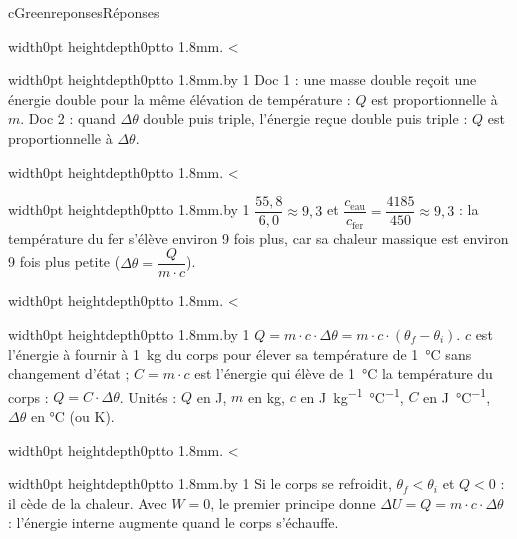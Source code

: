\documentclass[11pt,a4paper]{article}
\newif\ifeleve
\newlength{\interligne}\setlength{\interligne}{7mm}
\newlength{\replen}
\newcommand{\pointilles}{{\color{cInk2!60}\leaders\hbox to 1.8mm{\hss.\hss}\hfill}\kern0pt}
\newcommand{\lignes}[1]{\leavevmode\vrule width0pt height\dimexpr\interligne-1mm\relax depth0pt\pointilles
  \lgn=1 \loop\ifnum\lgn<#1 \par\nointerlineskip\noindent\vrule width0pt height\interligne depth0pt\pointilles\advance\lgn by 1 \repeat}
\newcommand{\rep}[1]{%
  \ifeleve
    \sbox{\repbox}{\parbox{\linewidth}{#1}}%
    \replen=\dimexpr\ht\repbox+\dp\repbox\relax
    \repn=\numexpr\replen/\baselineskip+1\relax
    \ifnum\repn<2 \repn=2\fi
    \edef\nblignes{\the\repn}\lignes{\nblignes}%
  \else #1\fi}
\newcommand{\titrereponses}{\ifeleve Mes réponses\else Réponses\fi}
\newcommand{\cu}{\unit{J.kg^{-1}.\degreeCelsius^{-1}}}
\newcommand{\muu}{\unit{J.\degreeCelsius^{-1}}}
\newcommand{\dC}[1]{\qty{#1}{\degreeCelsius}}
\begin{document}
\begin{rub}{cGreen}{reponses}{\titrereponses}
\begin{reps}
  \item \rep{Doc 1 : une masse double reçoit une énergie double pour la même élévation de température : $Q$ est proportionnelle à $m$. Doc 2 : quand $\Delta\theta$ double puis triple, l’énergie reçue double puis triple : $Q$ est proportionnelle à $\Delta\theta$.}
  \item \rep{$\dfrac{55{,}8}{6{,}0} \approx 9{,}3$ et $\dfrac{c_{\text{eau}}}{c_{\text{fer}}} = \dfrac{4185}{450} \approx 9{,}3$ : la température du fer s’élève environ 9 fois plus, car sa chaleur massique est environ 9 fois plus petite ($\Delta\theta = \dfrac{Q}{m\cdot c}$).}
  \item \rep{$Q = m\cdot c\cdot\Delta\theta = m\cdot c\cdot(\theta_f - \theta_i)$. $c$ est l’énergie à fournir à \qty{1}{kg} du corps pour élever sa température de \dC{1} sans changement d’état ; $C = m\cdot c$ est l’énergie qui élève de \dC{1} la température du corps : $Q = C\cdot\Delta\theta$. Unités : $Q$ en J, $m$ en kg, $c$ en \cu, $C$ en \muu, $\Delta\theta$ en \unit{\degreeCelsius} (ou K).}
  \item \rep{Si le corps se refroidit, $\theta_f < \theta_i$ et $Q < 0$ : il cède de la chaleur. Avec $W = 0$, le premier principe donne $\Delta U = Q = m\cdot c\cdot\Delta\theta$ : l’énergie interne augmente quand le corps s’échauffe.}
\end{reps}
\end{rub}
\end{document}
